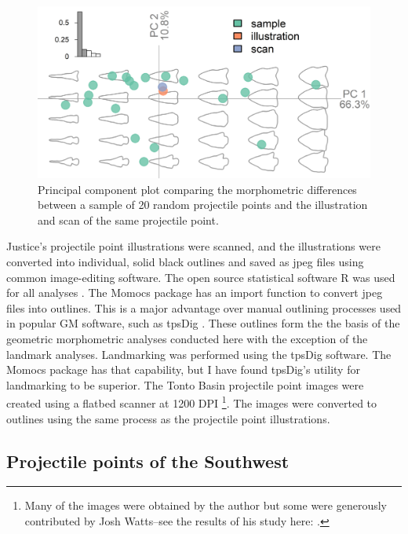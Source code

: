 \documentclass[a4paper]{article}
\begin{document}
\begin{figure}
\includegraphics[width=1\linewidth]{figures/comparisonPCA} \caption{Principal component plot comparing the morphometric differences between a sample of 20 random projectile points and the illustration and scan of the same projectile point.}\label{fig:comparisonPCA}
\end{figure}

Justice's projectile point illustrations were scanned, and the illustrations were converted into individual, solid black outlines and saved as jpeg files using common image-editing software. The open source statistical software R was used for all analyses \autocite{R_Core_Team2022-wb}. The Momocs package \autocite{Bonhomme2014-gt} has an import function to convert jpeg files into outlines. This is a major advantage over manual outlining processes used in popular GM software, such as tpsDig \autocite{James_Rohlf2015-ui}. These outlines form the the basis of the geometric morphometric analyses conducted here with the exception of the landmark analyses. Landmarking was performed using the tpsDig software. The Momocs package has that capability, but I have found tpsDig's utility for landmarking to be superior. The Tonto Basin projectile point images were created using a flatbed scanner at 1200 DPI \footnote{Many of the images were obtained by the author but some were generously contributed by Josh Watts--see the results of his study here: \autocite{Watts2013-ub}.}. The images were converted to outlines using the same process as the projectile point illustrations.

\hypertarget{projectile-points-of-the-southwest}{%
\subsection*{Projectile points of the Southwest}\label{projectile-points-of-the-southwest}}
\end{document}

